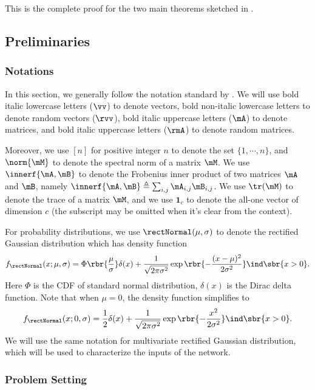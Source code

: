 This is the complete proof for the two main theorems sketched in .
\subsection{Preliminaries}
\label{sec:proof-prelim}
\subsubsection{Notations}
In this section, we generally follow the notation standard by \citet{goodfellow2016deep}. We will use bold italic lowercase letters ($\vv$) to denote vectors, bold non-italic lowercase letters to denote random vectors ($\rvv$), bold italic uppercase letters ($\mA$) to denote matrices, and bold italic uppercase letters ($\rmA$) to denote random matrices.

Moreover, we use $[n]$ for positive integer $n$ to denote the set $\{1,\cdots,n\}$, and $\norm{\mM}$ to denote the spectral norm of a matrix $\mM$. We use $\innerf{\mA, \mB}$ to denote the Frobenius inner product of two matrices $\mA$ and $\mB$, namely $\innerf{\mA, \mB} \triangleq\sum_{i,j}\mA_{i,j}\mB_{i,j}$. We use $\tr(\mM)$ to denote the trace of a matrix $\mM$, and we use $\textbf{1}_c$ to denote the all-one vector of dimension $c$ (the subscript may be omitted when it's clear from the context).

For probability distributions, we use $\rectNormal(\mu,\sigma)$ to denote the rectified Gaussian distribution which has density function\begin{equation}
    f_\rectNormal(x;\mu,\sigma) = \Phi\rbr{\frac\mu\sigma}\delta(x)+\frac{1}{\sqrt{2\pi\sigma^2}}\exp\rbr{-\frac{(x-\mu)^2}{2\sigma^2}}\ind\sbr{x> 0}.
\end{equation}
Here $\Phi$ is the CDF of standard normal distribution, $\delta(x)$ is the Dirac delta function. Note that when $\mu=0$, the density function simplifies to\begin{align}
    f_\rectNormal(x;0,\sigma) = 
    \frac12\delta(x)+\frac{1}{\sqrt{2\pi\sigma^2}}\exp\rbr{-\frac{x^2}{2\sigma^2}}\ind\sbr{x> 0}.
\end{align}
We will use the same notation for multivariate rectified Gaussian distribution, which will be used to characterize the inputs of the network.
\subsubsection{Problem Setting}

